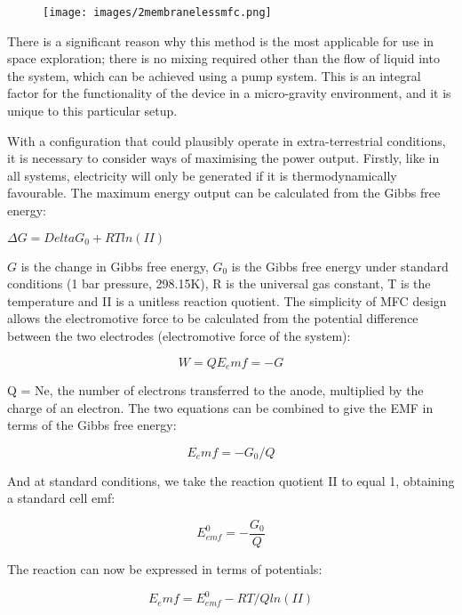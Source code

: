 \documentclass[12pt]{article}
\begin{document}
\begin{figure}
\centering
\texttt{[image: images/2membranelessmfc.png]}
\caption{\cite{ghangrekar2007performance}}
\label{fig:2membranelessmfc}
\end{figure}

There is a significant reason why this method is the most applicable for use in space exploration; there is no mixing required other than the flow of liquid into the system, which can be achieved using a pump system. This is an integral factor for the functionality of the device in a micro-gravity environment, and it is unique to this particular setup. \cite{min2004continuous}

With a configuration that could plausibly operate in extra-terrestrial conditions, it is necessary to consider ways of maximising the power output. Firstly, like in all systems, electricity will only be generated if it is thermodynamically favourable.  The maximum energy output can be calculated from the Gibbs free energy:

$\Delta G = Delta G_0 + RT ln(II)$

$G$ is the change in Gibbs free energy, $G_{0}$ is the Gibbs free energy under standard conditions (1 bar pressure, 298.15K), R is the universal gas constant, T is the temperature and II is a unitless reaction quotient. The simplicity of MFC design allows the electromotive force to be calculated from the potential difference between the two electrodes (electromotive force of the system): 

\begin{equation}
W=Q E_emf = -G
\end{equation}


Q = Ne, the number of electrons transferred to the anode, multiplied by the charge of an electron. The two equations can be combined to give the EMF in terms of the Gibbs free energy:

\begin{equation}
E_emf = - G_0 / Q
\end{equation}

And at standard conditions, we take the reaction quotient II to equal 1, obtaining a standard cell emf:

\begin{equation}
E^{0}_{emf} = - \frac{G_0}{ Q}
\end{equation}


The reaction can now be expressed in terms of potentials:

\begin{equation}
E_emf = E^{0}_{emf} - RT/Q ln (II)
\end{equation}
\end{document}
